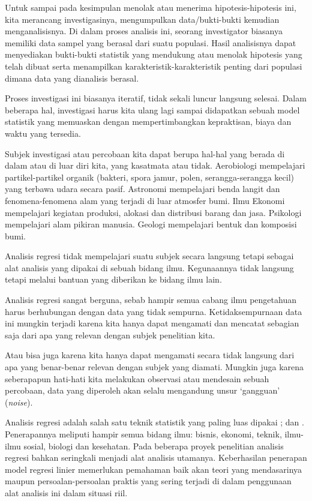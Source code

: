 \documentclass[
]{book}
\begin{document}
Untuk sampai pada kesimpulan menolak atau menerima hipotesis-hipotesis
ini, kita merancang investigasinya, mengumpulkan data/bukti-bukti
kemudian menganalisisnya. Di dalam proses analisis ini, seorang investigator biasanya memiliki data sampel yang berasal dari suatu populasi. Hasil analisisnya dapat menyediakan bukti-bukti statistik yang mendukung atau menolak hipotesis yang telah dibuat serta menampilkan karakteristik-karakteristik penting dari populasi dimana data yang dianalisis berasal.

Proses investigasi ini biasanya iteratif, tidak sekali luncur langsung
selesai. Dalam beberapa hal, investigasi harus kita ulang lagi sampai
didapatkan sebuah model statistik yang memuaskan dengan mempertimbangkan
kepraktisan, biaya dan waktu yang tersedia.

Subjek investigasi atau percobaan kita dapat berupa hal-hal yang berada
di dalam atau di luar diri kita, yang kasatmata atau tidak. Aerobiologi
mempelajari partikel-partikel organik (bakteri, spora jamur, polen,
serangga-serangga kecil) yang terbawa udara secara pasif. Astronomi
mempelajari benda langit dan fenomena-fenomena alam yang terjadi di luar
atmosfer bumi. Ilmu Ekonomi mempelajari kegiatan produksi, alokasi dan
distribusi barang dan jasa. Psikologi mempelajari alam pikiran manusia.
Geologi mempelajari bentuk dan komposisi bumi.

Analisis regresi tidak mempelajari suatu subjek secara langsung tetapi
sebagai alat analisis yang dipakai di sebuah bidang ilmu. Kegunaannya
tidak langsung tetapi melalui bantuan yang diberikan ke bidang ilmu
lain.

Analisis regresi sangat berguna, sebab hampir semua cabang ilmu
pengetahuan harus berhubungan dengan data yang tidak sempurna.
Ketidaksempurnaan data ini mungkin terjadi karena kita hanya dapat
mengamati dan mencatat sebagian saja dari apa yang relevan dengan subjek
penelitian kita.

Atau bisa juga karena kita hanya dapat mengamati secara tidak langsung
dari apa yang benar-benar relevan dengan subjek yang diamati. Mungkin
juga karena seberapapun hati-hati kita melakukan observasi atau
mendesain sebuah percobaan, data yang diperoleh akan selalu mengandung
unsur `gangguan' (\emph{noise}).

Analisis regresi adalah salah satu teknik statistik yang paling luas dipakai \citep{agresti2015}; \citep{frees2010} dan \citep{lee2013}.
Penerapannya meliputi hampir semua bidang ilmu: bisnis, ekonomi, teknik,
ilmu-ilmu sosial, biologi dan kesehatan. Pada beberapa proyek penelitian
analisis regresi bahkan seringkali menjadi alat analisis utamanya.
Keberhasilan penerapan model regresi linier memerlukan pemahaman baik
akan teori yang mendasarinya maupun persoalan-persoalan praktis yang
sering terjadi di dalam penggunaan alat analisis ini dalam situasi riil.
\end{document}
